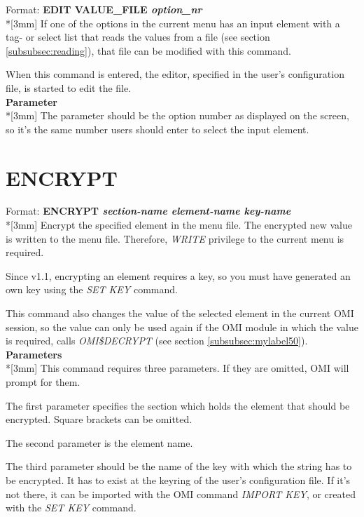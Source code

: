 \documentclass[a4paper]{book}
\newcommand{\vs}{\vspace{3mm}}
\renewcommand{\indent}{\hspace*{5mm}}
\begin{document}
\indent Format: \textbf{EDIT VALUE{\_}FILE \textit{option{\_}nr}}\\*[3mm]
If one of the options in the current menu has an input element with a tag- 
or select list that reads the values from a file (see section 
\ref{subsubsec:reading}), that file can be modified with this command.

When this command is entered, the editor, specified in the user's 
configuration file, is started to edit the file.\\[3mm]
\textbf{Parameter}\\*[3mm]
The parameter should be the option number as displayed on the screen, so 
it's the same number users should enter to select the input element.


\section{ENCRYPT}
\label{subsec:encrypt}

\indent Format: \textbf{ENCRYPT \textit{section-name element-name key-name}}\dag\\*[3mm]
Encrypt the specified element in the menu file. The encrypted new value is 
written to the menu file. Therefore, \textsl{WRITE} privilege to the current menu is 
required.

Since v1.1, encrypting an element requires a key, so you must have generated 
an own key using the \textsl{SET KEY} command.

\vs

This command also changes the value of the selected element in the current 
OMI session, so the value can only be used again if the OMI module in which 
the value is required, calls \textsl{OMI{\$}DECRYPT} (see section \ref{subsubsec:mylabel50}).\\[3mm]
\textbf{Parameters}\\*[3mm]
This command requires three parameters. If they are omitted, OMI will prompt 
for them.

\vs

The first parameter specifies the section which holds the element that 
should be encrypted. Square brackets can be omitted.

The second parameter is the element name.

The third parameter should be the name of the key with which the string has 
to be encrypted. It has to exist at the keyring of the user's configuration 
file. If it's not there, it can be imported with the OMI command \textsl{IMPORT KEY}, 
or created with the \textsl{SET KEY} command.
\end{document}
